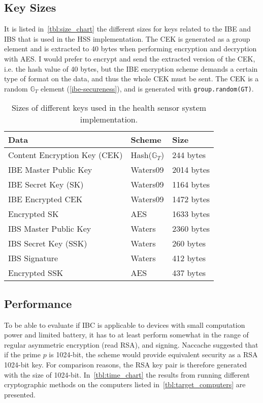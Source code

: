 \subsection{Key Sizes}
It is listed in~\autoref{tbl:size_chart} the different sizes for keys related to the \gls{IBE} and \gls{IBS} that is used in the \gls{HSS} implementation.
The \gls{CEK} is generated as a group element and is extracted to 40 bytes when performing encryption and decryption with \gls{AES}.
I would prefer to encrypt and send the extracted version of the \gls{CEK}, i.e. the hash value of 40 bytes, but the \gls{IBE} encryption scheme demands a certain type of format on the data, and thus the whole \gls{CEK} must be sent.
The \gls{CEK} is a random $\mathbb{G}_T$ element (\autoref{ibe-secureness}), and is generated with \texttt{group.random(GT)}.
\begin{table}[h]
  \begin{tabular}[c]{p{}p{}p{}}
  Data                            & Scheme          & Size              \\ \hline
  Content Encryption Key (CEK)    & Hash($\mathbb{G}_T$) & 244 bytes         \\ %
  IBE Master Public Key           & Waters09        & 2014 bytes        \\ %
  IBE Secret Key (SK)             & Waters09        & 1164 bytes        \\ %
  IBE Encrypted CEK               & Waters09        & 1472 bytes        \\ %
  Encrypted SK                    & AES             & 1633 bytes        \\ %
  IBS Master Public Key           & Waters          & 2360 bytes        \\ %
  IBS Secret Key (SSK)            & Waters          & 260 bytes         \\ %
  IBS Signature                   & Waters          & 412 bytes         \\ %
  Encrypted SSK                   & AES             & 437 bytes         \\ %
  \end{tabular}
  \caption{Sizes of different keys used in the health sensor system implementation.}
  \label{tbl:size_chart}
\end{table}


\subsection{Performance}\label{ibc-performance}
To be able to evaluate if \gls{IBC} is applicable to devices with small computation power and limited battery, it has to at least perform somewhat in the range of regular asymmetric encryption (read RSA), and signing. 
Naccache suggested that if the prime $p$ is 1024-bit, the scheme would provide equivalent security as a RSA 1024-bit key.
For comparison reasons, the RSA key pair is therefore generated with the size of 1024-bit.
In~\autoref{tbl:time_chart} the results from running different cryptographic methods on the computers listed in~\autoref{tbl:target_computers} are presented.

